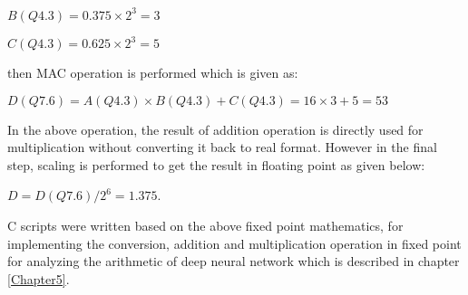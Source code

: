 \noindent $B(Q4.3)= 0.375\times 2^{3}=3$

\noindent $C(Q4.3)= 0.625\times 2^{3}=5$

\noindent then MAC operation is performed which is given as:

\noindent $D(Q7.6)= A(Q4.3)\times B(Q4.3)+C(Q4.3)= 16\times 3+5= 53$

\vspace{0.25cm}
\noindent In the above operation, the result of addition operation is directly used for multiplication without converting it back to real format. However in the final step, scaling is performed to get the result in floating point as given below:

\noindent $D= D(Q7.6)/2^{6}= 1.375$.

\vspace{0.25cm}
C scripts were written based on the above fixed point mathematics, for implementing the conversion, addition and multiplication operation in fixed point for analyzing the arithmetic of deep neural network which is described in chapter \ref{Chapter5}. 